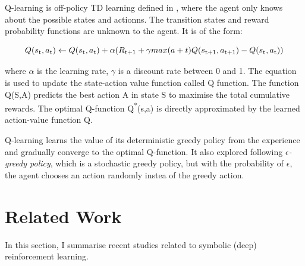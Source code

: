 \documentclass[12pt,twoside]{report}
\begin{document}
Q-learning is off-policy TD learning defined in \cite{Watkins}, where the agent only knows about the possible states and actionns. The transition states and reward probability functions are unknown to the agent.
It is of the form:

\begin{equation}
Q(s\textsubscript{t},a\textsubscript{t}) \leftarrow Q(s\textsubscript{t},a\textsubscript{t}) +  \alpha(R\textsubscript{t+1} + \gamma  max (a+t) Q(s\textsubscript{t+1}, a\textsubscript{t+1}) - Q(s\textsubscript{t}, a\textsubscript{t}))
\end{equation}

where $\alpha$ is the learning rate, $\gamma$ is a discount rate between 0 and 1. The equation is used to update the state-action value function called Q function. The function Q(S,A) predicts the best action A in state S to maximise the total cumulative rewards.
The optimal Q-function Q\textsuperscript{*}(s,a) is directly approximated by the learned action-value function Q.

Q-learning learns the value of its deterministic greedy policy from the experience and gradually converge to the optimal Q-function. It also explored following \textit{$\epsilon$-greedy policy}, which is a stochastic greedy policy, but with the probability of $\epsilon$, the agent chooses an action randomly instea of the greedy action.

\chapter{Related Work}
\label{related_work}
In this section, I summarise recent studies related to symbolic (deep) reinforcement learning.
\end{document}
